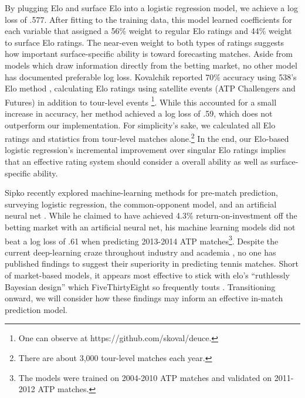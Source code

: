 \documentclass[chapterprefix=false]{report}
\begin{document}
By plugging Elo and surface Elo into a logistic regression model, we achieve a log loss of .577. After fitting to the training data, this model learned coefficients for each variable that assigned a 56\% weight to regular Elo ratings and 44\% weight to surface Elo ratings. The near-even weight to both types of ratings suggests how important surface-specific ability is toward forecasting matches. Aside from models which draw information directly from the betting market, no other model has documented preferable log loss. Kovalchik reported 70$\%$ accuracy using 538's Elo method \citep{Kovalchik2016}, calculating Elo ratings using satellite events (ATP Challengers and Futures) in addition to tour-level events \footnote{One can observe at https://github.com/skoval/deuce.}. While this accounted for a small increase in accuracy, her method achieved a log loss of .59, which does not outperform our implementation. For simplicity's sake, we calculated all Elo ratings and statistics from tour-level matches alone.\footnote{There are about 3,000 tour-level matches each year.} In the end, our Elo-based logistic regression's incremental improvement over singular Elo ratings implies that an effective rating system should consider a overall ability as well as surface-specific ability.




Sipko recently explored machine-learning methods for pre-match prediction, surveying logistic regression, the common-opponent model, and an artificial neural net \citep{Sipko2015}. While he claimed to have achieved 4.3$\%$ return-on-investment off the betting market with an artificial neural net, his machine learning models did not beat a log loss of .61 when predicting 2013-2014 ATP matches\footnote{The models were trained on 2004-2010 ATP matches and validated on 2011-2012 ATP matches.}. Despite the current deep-learning craze throughout industry and academia \citep{lewis2016great}, no one has published findings to suggest their superiority in predicting tennis matches. Short of market-based models, it appears most effective to stick with elo's ``ruthlessly Bayesian design'' which FiveThirtyEight so frequently touts \citep{HowForecasting}. Transitioning onward, we will consider how these findings may inform an effective in-match prediction model.
\end{document}
